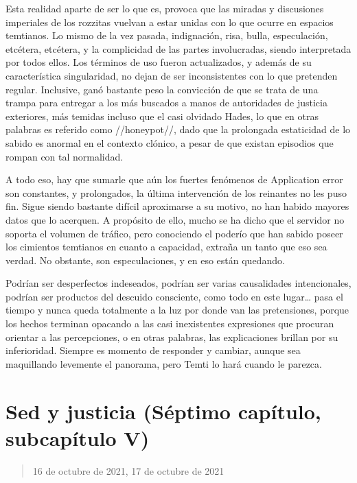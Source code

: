 \documentclass[
  spanish,
]{book}
\begin{document}
Esta realidad aparte de ser lo que es, provoca que las miradas y discusiones imperiales de los rozzitas vuelvan a estar unidas con lo que ocurre en espacios temtianos. Lo mismo de la vez pasada, indignación, risa, bulla, especulación, etcétera, etcétera, y la complicidad de las partes involucradas, siendo interpretada por todos ellos. Los términos de uso fueron actualizados, y además de su característica singularidad, no dejan de ser inconsistentes con lo que pretenden regular. Inclusive, ganó bastante peso la convicción de que se trata de una trampa para entregar a los más buscados a manos de autoridades de justicia exteriores, más temidas incluso que el casi olvidado Hades, lo que en otras palabras es referido como //honeypot//, dado que la prolongada estaticidad de lo sabido es anormal en el contexto clónico, a pesar de que existan episodios que rompan con tal normalidad.

A todo eso, hay que sumarle que aún los fuertes fenómenos de Application error son constantes, y prolongados, la última intervención de los reinantes no les puso fin. Sigue siendo bastante difícil aproximarse a su motivo, no han habido mayores datos que lo acerquen. A propósito de ello, mucho se ha dicho que el servidor no soporta el volumen de tráfico, pero conociendo el poderío que han sabido poseer los cimientos temtianos en cuanto a capacidad, extraña un tanto que eso sea verdad. No obstante, son especulaciones, y en eso están quedando.

Podrían ser desperfectos indeseados, podrían ser varias causalidades intencionales, podrían ser productos del descuido consciente, como todo en este lugar\ldots{} pasa el tiempo y nunca queda totalmente a la luz por donde van las pretensiones, porque los hechos terminan opacando a las casi inexistentes expresiones que procuran orientar a las percepciones, o en otras palabras, las explicaciones brillan por su inferioridad. Siempre es momento de responder y cambiar, aunque sea maquillando levemente el panorama, pero Temti lo hará cuando le parezca.

\hypertarget{sed-y-justicia-suxe9ptimo-capuxedtulo-subcapuxedtulo-v}{%
\section{Sed y justicia (Séptimo capítulo, subcapítulo V)}\label{sed-y-justicia-suxe9ptimo-capuxedtulo-subcapuxedtulo-v}}

\begin{quote}
16 de octubre de 2021, 17 de octubre de 2021
\end{quote}
\end{document}
